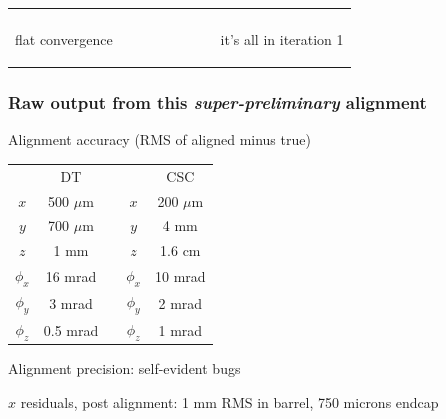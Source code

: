 \documentclass[compress]{beamer}
\begin{document}
\begin{frame}
\begin{center}
\begin{tabular}{p{0.4\linewidth} c p{0.4\linewidth}}
\begin{minipage}{\linewidth}
  \end{minipage} \\
  \begin{minipage}{\linewidth}
    \begin{center}
      flat convergence
    \end{center}
  \end{minipage} & &
  \begin{minipage}{\linewidth}
    \begin{center}
      it's all in iteration 1
    \end{center}
  \end{minipage}
\end{tabular}
\end{center}
\end{frame}

\begin{frame}
\frametitle{Raw output from this {\it super-preliminary} alignment}

Alignment accuracy (RMS of aligned minus true)
\begin{center}
\begin{tabular}{c | c p{2 cm} c | c}
& DT & & & CSC \\
$x$ & 500 $\mu$m & & $x$ & 200 $\mu$m \\
$y$ & 700 $\mu$m & & $y$ & 4 mm \\
$z$ & 1 mm & & $z$ & 1.6 cm \\
$\phi_x$ & 16 mrad & & $\phi_x$ & 10 mrad \\
$\phi_y$ & 3 mrad & & $\phi_y$ & 2 mrad \\
$\phi_z$ & 0.5 mrad & & $\phi_z$ & 1 mrad \\
\end{tabular}
\end{center}

\vfill
Alignment precision: self-evident bugs

\vfill
$x$ residuals, post alignment: 1 mm RMS in barrel, 750 microns endcap
\end{frame}
\end{document}
